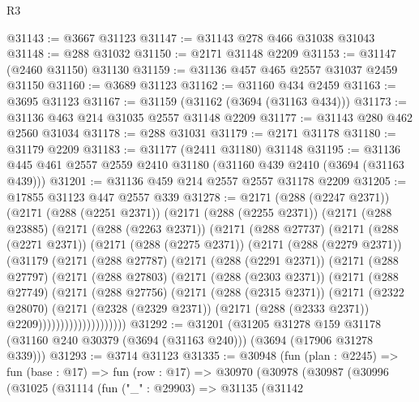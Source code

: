 \begin{lexlean}{R3}
\begin{coremodule}
@31143 := @3667 @31123
@31147 := @31143 @278 @466 @31038 @31043
@31148 := @288 @31032
@31150 := @2171 @31148 @2209
@31153 := @31147 (@2460 @31150) @31130
@31159 := @31136 @457 @465 @2557 @31037 @2459 @31150
@31160 := @3689 @31123
@31162 := @31160 @434 @2459
@31163 := @3695 @31123
@31167 := @31159 (@31162 (@3694 (@31163 @434)))
@31173 := @31136 @463 @214 @31035 @2557 @31148 @2209
@31177 := @31143 @280 @462 @2560 @31034
@31178 := @288 @31031
@31179 := @2171 @31178
@31180 := @31179 @2209
@31183 := @31177 (@2411 @31180) @31148
@31195 := @31136 @445 @461 @2557 @2559 @2410 @31180 (@31160 @439 @2410 (@3694 (@31163 @439)))
@31201 := @31136 @459 @214 @2557 @2557 @31178 @2209
@31205 := @17855 @31123 @447 @2557 @339
@31278 := @2171
    (@288 (@2247 @2371))
    (@2171
      (@288 (@2251 @2371))
      (@2171
        (@288 (@2255 @2371))
        (@2171
          (@288 @23885)
          (@2171
            (@288 (@2263 @2371))
            (@2171
              (@288 @27737)
              (@2171
                (@288 (@2271 @2371))
                (@2171
                  (@288 (@2275 @2371))
                  (@2171
                    (@288 (@2279 @2371))
                    (@31179
                      (@2171
                        (@288 @27787)
                        (@2171
                          (@288 (@2291 @2371))
                          (@2171
                            (@288 @27797)
                            (@2171
                              (@288 @27803)
                              (@2171
                                (@288 (@2303 @2371))
                                (@2171
                                  (@288 @27749)
                                  (@2171
                                    (@288 @27756)
                                    (@2171
                                      (@288 (@2315 @2371))
                                      (@2171
                                        (@2322 @28070)
                                        (@2171
                                          (@2328 (@2329 @2371))
                                          (@2171 (@288 (@2333 @2371)) @2209))))))))))))))))))))
@31292 := @31201
    (@31205
      @31278
      @159
      @31178
      (@31160 @240 @30379 (@3694 (@31163 @240)))
      (@3694 (@17906 @31278 @339)))
@31293 := @3714 @31123
@31335 := @30948
    (fun (plan : @2245) =>
    fun (base : @17) =>
    fun (row : @17) =>
    @30970
      (@30978
        (@30987
          (@30996
            (@31025
              (@31114
                (fun ("_" : @29903) =>
                @31135
                  (@31142

\end{coremodule}
\end{lexlean}
